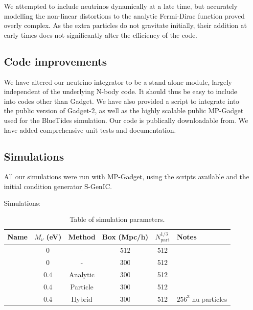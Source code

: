 \documentclass[useAMS, usenatbib]{mnras}
\begin{document}
We attempted to include neutrinos dynamically at a late time, but
accurately modelling the non-linear distortions to the analytic
Fermi-Dirac function proved overly complex. As the extra particles
do not gravitate initially, their addition at early times does
not significantly alter the efficiency of the code.


\subsection{Code improvements}
\label{sec:code}

We have altered our neutrino integrator to be a stand-alone module, largely
independent of the underlying N-body code. It should thus be easy to include
into codes other than Gadget. We have also provided a script to integrate into the
public version of Gadget-2, as well as the highly scalable public MP-Gadget
used for the BlueTides simulation. Our code is publically downloadable from.
We have added comprehensive unit tests and documentation.

\subsection{Simulations}
\label{sec:simulations}

All our simulations were run with MP-Gadget, using the scripts available
and the initial condition generator S-GenIC.

Simulations:
\begin{table}
\begin{center}
\begin{tabular}{|l|c|c|c|c|l|}
\hline
Name & $M_\nu$ (eV) & Method & Box (Mpc/h) & $N_\mathrm{part}^{1/3}$ & Notes \\
\hline
    &       0             &    -          & 512         & 512       &       \\
    &       0             &    -          & 300         & 512       &       \\
    &     0.4             &   Analytic    & 300         & 512       &       \\
    &     0.4             &   Particle    & 300         & 512       &       \\
    &     0.4             &   Hybrid      & 300         & 512       &  $256^3$ nu particles    \\

\hline
\end{tabular}
\end{center}
\caption{Table of simulation parameters.
}
\label{tab:simulations}
\end{table}
\end{document}
